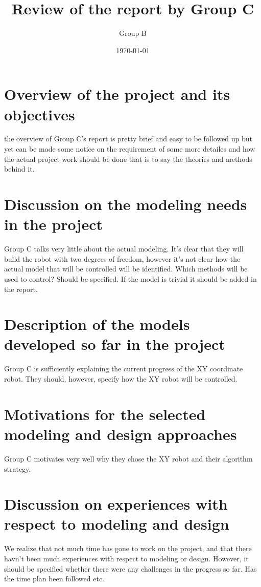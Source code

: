 \documentclass[a4paper]{article}
\title{Review of the report by Group C}
\author{Group B}
\date{\today}
\begin{document}
\maketitle

\newpage

\section*{Overview of the project and its objectives}

the overview of Group C's report is pretty brief and easy to be followed up but yet can be made some notice on the requirement of some  more detailes and how the actual project work should be done that is to say the theories and methods behind it. 


\section*{Discussion on the modeling needs in the project}

Group C talks very little about the actual modeling. It's clear that they will build the robot with two degrees of freedom, however it's not clear how the actual model that will be controlled will be identified. Which methods will be used to control? Should be specified. If the model is trivial it should be added in the report.


\section*{Description of the models developed so far in the project}

Group C is sufficiently explaining the current progress of the XY coordinate robot. They should, however, specify how the XY robot will be controlled.

\section*{Motivations for the selected modeling and design approaches}

Group C motivates very well why they chose the XY robot and their algorithm strategy.


\section*{Discussion on experiences with respect to modeling and design}

We realize that not much time has gone to work on the project, and that there havn't been much experiences with respect to modeling or design. However, it should be specified whether there were any challenges in the progress so far. Has the time plan been followed etc.
\end{document}
